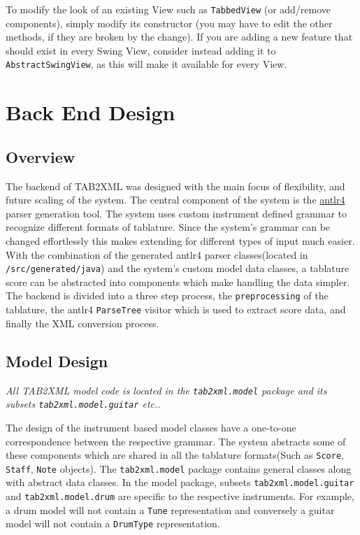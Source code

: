 \documentclass[11pt]{article}
\begin{document}
To modify the look of an existing View such as \texttt{TabbedView} (or add/remove components), simply modify its constructor (you may have to edit the other methods, if they are broken by the change).  If you are adding a new feature that should exist in every Swing View, consider instead adding it to \texttt{AbstractSwingView}, as this will make it available for every View.

\newpage

\section{Back End Design}
\label{sec:org08e6235}
\subsection{Overview}
\label{sec:org8e5bd24}
The backend of TAB2XML was designed with the main focus of flexibility, and future scaling of the system. The central component of the system is the \href{https://www.antlr.org/}{antlr4} parser generation tool. The system uses custom instrument defined grammar to recognize different formats of tablature. Since the system's grammar can be changed effortlessly this makes extending for different types of input much easier. With the combination of the generated antlr4 parser classes(located in \texttt{/src/generated/java}) and the system's custom model data classes, a tablature score can be abstracted into components which make handling the data simpler. The backend is divided into a three step process, the \texttt{preprocessing} of the tablature, the antlr4 \texttt{ParseTree} visitor which is used to extract score data, and finally the XML conversion process.


\subsection{Model Design}
\label{sec:org613c297}
\emph{All TAB2XML model code is located in the \texttt{tab2xml.model} package and its subsets \texttt{tab2xml.model.guitar} etc..}

The design of the instrument based model classes have a one-to-one correspondence between the respective grammar. The system abstracts some of these components which are shared in all the tablature formats(Such as \texttt{Score}, \texttt{Staff}, \texttt{Note} objects). The \texttt{tab2xml.model} package contains general classes along with abstract data classes. In the model package, subsets \texttt{tab2xml.model.guitar} and \texttt{tab2xml.model.drum} are specific to the respective instruments. For example, a drum model will not contain a \texttt{Tune} representation and conversely a guitar model will not contain a \texttt{DrumType} representation.
\end{document}
